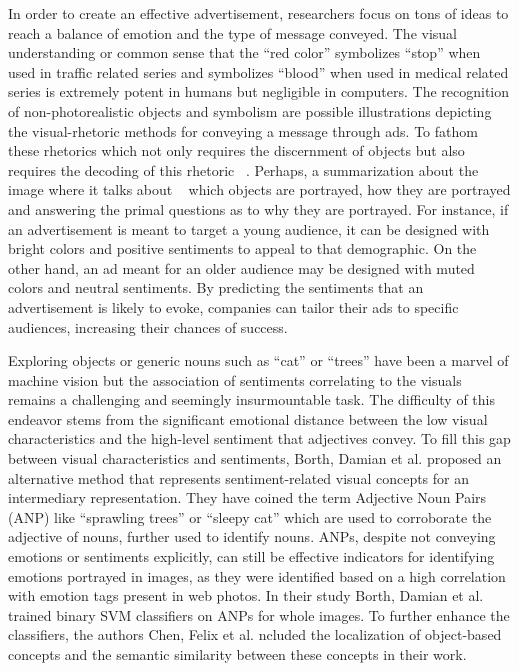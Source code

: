 \documentclass[conference]{IEEEtran}
\begin{document}
In order to create an effective advertisement, researchers focus on tons of ideas to reach a balance of emotion and the type of message conveyed. The visual understanding or common sense that the “red color” symbolizes “stop” when used in traffic related series and symbolizes “blood” when used in medical related series is extremely potent in humans but negligible in computers. The recognition of non-photorealistic objects and symbolism are possible illustrations depicting the visual-rhetoric methods for conveying a message through ads. To fathom these rhetorics which not only requires the discernment of objects but also requires the decoding of this rhetoric \cite{b4}~\cite{b5}. Perhaps, a summarization about the image where it talks about \cite{b6}~\cite{b7} which objects are portrayed, how they are portrayed and answering the primal questions as to why they are portrayed. For instance, if an advertisement is meant to target a young audience, it can be designed with bright colors and positive sentiments to appeal to that demographic. On the other hand, an ad meant for an older audience may be designed with muted colors and neutral sentiments. By predicting the sentiments that an advertisement is likely to evoke, companies can tailor their ads to specific audiences, increasing their chances of success.

Exploring objects or generic nouns such as “cat” or “trees” have been a marvel of machine vision but the association of sentiments correlating to the visuals remains a challenging and seemingly insurmountable task. The difficulty of this endeavor stems from the significant emotional distance between the low visual characteristics and the high-level sentiment that adjectives convey. To fill this gap between visual characteristics and sentiments, Borth, Damian et al.\cite{b8} proposed an alternative method that represents sentiment-related visual concepts for an intermediary  representation. They have coined the term Adjective Noun Pairs (ANP) like “sprawling trees” or “sleepy cat” which are used to corroborate the adjective of nouns, further used to identify nouns. ANPs, despite not conveying emotions or sentiments explicitly, can still be effective indicators for identifying emotions portrayed in images, as they were identified based on a high correlation with emotion tags present in web photos. In their study Borth, Damian et al.\cite{b8} trained binary SVM classifiers on ANPs for whole images. To further enhance the classifiers, the authors Chen, Felix et al.\cite{b9} ncluded the localization of object-based concepts and the semantic similarity between these concepts in their work.
\end{document}
